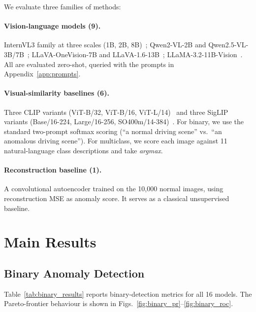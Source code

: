 \documentclass{article}
\begin{document}
We evaluate three families of methods:

\paragraph{Vision-language models (9).}
InternVL3 family at three scales (1B, 2B, 8B)~\citep{internvl3};
Qwen2-VL-2B and Qwen2.5-VL-3B/7B~\citep{qwen25vl}; LLaVA-OneVision-7B
and LLaVA-1.6-13B~\citep{llava_onevision, llava_15};
LLaMA-3.2-11B-Vision~\citep{llama32_vision}. All are evaluated
zero-shot, queried with the prompts in
Appendix~\ref{app:prompts}.

\paragraph{Visual-similarity baselines (6).}
Three CLIP variants (ViT-B/32, ViT-B/16, ViT-L/14)~\citep{clip} and
three SigLIP variants (Base/16-224, Large/16-256,
SO400m/14-384)~\citep{siglip2}. For binary, we use the standard
two-prompt softmax scoring (``a normal driving scene'' vs.\ ``an
anomalous driving scene''). For multiclass, we score each image
against 11 natural-language class descriptions and take
\textit{argmax}.

\paragraph{Reconstruction baseline (1).}
A convolutional autoencoder trained on the 10{,}000 normal images,
using reconstruction MSE as anomaly score. It serves as a classical
unsupervised baseline.

\section{Main Results}
\label{sec:results}

\subsection{Binary Anomaly Detection}
\label{sec:binary}



Table~\ref{tab:binary_results} reports binary-detection metrics for
all 16 models. The Pareto-frontier behaviour is shown in
Figs.~\ref{fig:binary_pr}--\ref{fig:binary_roc}.
\end{document}
